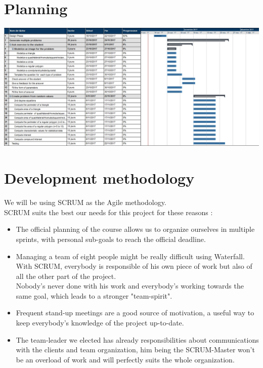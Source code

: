 \documentclass{article}
\begin{document}
\section{Planning}
\begin{center}
    \includegraphics[scale=0.68,angle=90]{multipleproblems.jpg}
\end{center}
\section{Development methodology}

    We will be using SCRUM as the Agile methodology.\\

    SCRUM suits the best our needs for this project for these reasons : \\

        \begin{itemize}
            \item The official planning of the course allows us to organize ourselves
            in multiple sprints, with personal sub-goals to reach the
            official deadline.
            \item Managing a team of eight people might be really difficult using
            Waterfall. With SCRUM, everybody is responsible of his own piece of
            work but also of all the other part of the project.\\
            Nobody's never done with his work and everybody's working towards the
            same goal, which leads to a stronger "team-spirit".
            \item Frequent stand-up meetings are a good source of motivation, a
            useful way to keep everybody's knowledge of the project up-to-date.
            \item The team-leader we elected has already responsibilities about
            communications with the clients and team organization, him being the
            SCRUM-Master won't be an overload of work and will perfectly suits the
            whole organization.

    \end{itemize}
\end{document}
